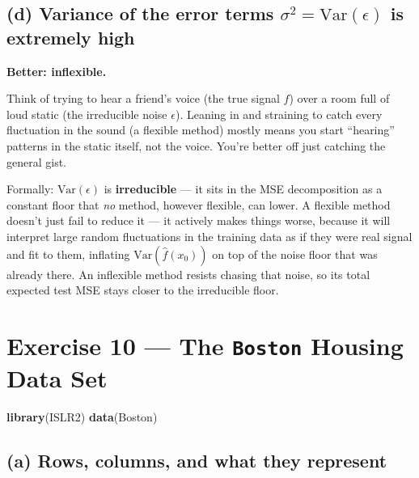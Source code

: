 \documentclass[
  11pt,
]{article}
\newenvironment{Shaded}{\begin{snugshade}}{\end{snugshade}}
\newcommand{\FunctionTok}[1]{\textcolor[rgb]{0.13,0.29,0.53}{\textbf{#1}}}
\newcommand{\NormalTok}[1]{#1}
\begin{document}
\subsection{\texorpdfstring{(d) Variance of the error terms
\(\sigma^2 = \text{Var}(\epsilon)\) is extremely
high}{(d) Variance of the error terms \textbackslash sigma\^{}2 = \textbackslash text\{Var\}(\textbackslash epsilon) is extremely high}}\label{d-variance-of-the-error-terms-sigma2-textvarepsilon-is-extremely-high}

\textbf{Better: inflexible.}

Think of trying to hear a friend's voice (the true signal \(f\)) over a
room full of loud static (the irreducible noise \(\epsilon\)). Leaning
in and straining to catch every fluctuation in the sound (a flexible
method) mostly means you start ``hearing'' patterns in the static
itself, not the voice. You're better off just catching the general gist.

Formally: \(\text{Var}(\epsilon)\) is \textbf{irreducible} --- it sits
in the MSE decomposition as a constant floor that \emph{no} method,
however flexible, can lower. A flexible method doesn't just fail to
reduce it --- it actively makes things worse, because it will interpret
large random fluctuations in the training data as if they were real
signal and fit to them, inflating \(\text{Var}(\hat{f}(x_0))\) on top of
the noise floor that was already there. An inflexible method resists
chasing that noise, so its total expected test MSE stays closer to the
irreducible floor.

\newpage

\section{\texorpdfstring{Exercise 10 --- The \texttt{Boston} Housing
Data
Set}{Exercise 10 --- The Boston Housing Data Set}}\label{exercise-10-the-boston-housing-data-set}

\begin{Shaded}
\begin{Highlighting}[]
\FunctionTok{library}\NormalTok{(ISLR2)}
\FunctionTok{data}\NormalTok{(Boston)}
\end{Highlighting}
\end{Shaded}

\subsection{(a) Rows, columns, and what they
represent}\label{a-rows-columns-and-what-they-represent}
\end{document}
